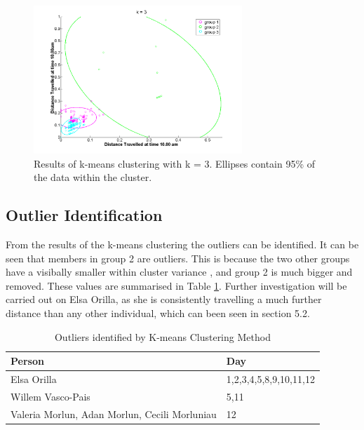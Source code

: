\begin{figure}[!ht]
\centering
\includegraphics[width=0.7\textwidth]{Images/4cluster.png}
\caption{\label{fig:4cluster} Results of k-means clustering with k = 3. Ellipses contain 95\% of the data within the cluster.}
\end{figure}





\subsection{Outlier Identification}
\label{sec:outliers}
From the results of the k-means clustering the outliers can be identified. It can be seen that members in group 2 are outliers. This is because the two other groups have a visibally smaller within cluster variance , and group 2 is much bigger and removed. These values are summarised in Table \ref{table:outliers}. Further investigation will be carried out on Elsa Orilla, as she is consistently travelling a much further distance than any other individual, which can been seen in section 5.2.


\begin{table}[H]
\begin{center}
\begin{tabular}{|l|l|}
\hline  
Person & Day  \\ \hline \hline
Elsa Orilla     &   1,2,3,4,5,8,9,10,11,12   \\ \hline
Willem Vasco-Pais    &  5,11   \\ \hline
Valeria Morlun, Adan Morlun, Cecili Morluniau&    12   \\ \hline

\end {tabular}
\caption{\label{table:outliers}Outliers identified by K-means Clustering Method}
\end{center}
\end{table}




